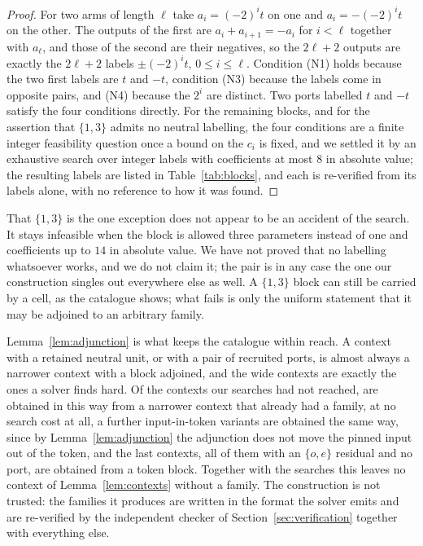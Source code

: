 \documentclass[11pt,a4paper]{article}
\theoremstyle{plain}
\theoremstyle{definition}
\theoremstyle{remark}
\begin{document}
\begin{proof}
For two arms of length $\ell$ take $a_i=(-2)^it$ on one and $a_i=-(-2)^it$ on
the other.  The outputs of the first are $a_i+a_{i+1}=-a_i$ for $i<\ell$
together with $a_\ell$, and those of the second are their negatives, so the
$2\ell+2$ outputs are exactly the $2\ell+2$ labels $\pm(-2)^it$,
$0\le i\le\ell$.  Condition (N1) holds because the two first labels are $t$
and $-t$, condition (N3) because the labels come in opposite pairs, and (N4)
because the $2^i$ are distinct.  Two ports labelled $t$ and $-t$ satisfy the
four conditions directly.  For the remaining blocks, and for the assertion
that $\{1,3\}$ admits no neutral labelling, the four conditions are a finite
integer feasibility question once a bound on the $c_i$ is fixed, and we
settled it by an exhaustive search over integer labels with coefficients at
most $8$ in absolute value; the resulting labels are listed in
Table~\ref{tab:blocks}, and each is re-verified from its labels alone, with no
reference to how it was found.
\end{proof}

That $\{1,3\}$ is the one exception does not appear to be an accident of the
search.  It stays infeasible when the block is allowed three parameters
instead of one and coefficients up to $14$ in absolute value.  We have not
proved that no labelling whatsoever works, and we do not claim it; the pair is
in any case the one our construction singles out everywhere else as well.  A $\{1,3\}$ block can still be carried
by a cell, as the catalogue shows; what fails is only the uniform statement
that it may be adjoined to an arbitrary family.

Lemma~\ref{lem:adjunction} is what keeps the catalogue within reach.  A
context with a retained neutral unit, or with a pair of recruited ports, is
almost always a narrower context with a block adjoined, and the wide contexts
are exactly the ones a solver finds hard.  Of the \NumNeutralTargets{}
contexts our searches had not reached, \NumNeutralBuilt{} are obtained in this
way from a narrower context that already had a family, at no search cost at
all, a further \NumNeutralVariantBuilt{} input-in-token variants are obtained
the same way, since by Lemma~\ref{lem:adjunction} the adjunction does not move
the pinned input out of the token, and the last \NumNeutralTokenBuilt{}
contexts, all of them with an $\{o,e\}$ residual and no port, are obtained from
a token block.  Together with the searches this leaves no context of
Lemma~\ref{lem:contexts} without a family.  The construction is
not trusted: the families it produces are written in the format the solver
emits and are re-verified by the independent checker of
Section~\ref{sec:verification} together with everything else.
\end{document}
